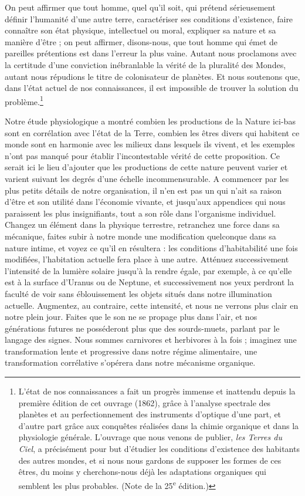 \documentclass[a4paper, 11pt, oneside, landscape]{article}
\begin{document}
On peut affirmer que tout homme, quel qu'il soit, qui prétend sérieusement définir l'humanité d'une autre terre, caractériser ses conditions d'existence, faire connaître son état physique, intellectuel ou moral, expliquer sa nature et sa manière d'être ; on peut affirmer, disons-nous, que tout homme qui émet de pareilles prétentions est dans l'erreur la plus vaine. Autant nous proclamons avec la certitude d'une conviction inébranlable la vérité de la pluralité des Mondes, autant nous répudions le titre de colonisateur de planètes. Et nous soutenons que, dans l'état actuel de nos connaissances, il est impossible de trouver la solution du problème.\footnote{L'état de nos connaissances a fait un progrès immense et inattendu depuis la première édition de cet ouvrage (1862), grâce à l'analyse spectrale des planètes et au perfectionnement des instruments d'optique d'une part, et d'autre part grâce aux conquêtes réalisées dans la chimie organique et dans la physiologie générale. L'ouvrage que nous venons de publier, \emph{les Terres du Ciel}, a précisément pour but d'étudier les conditions d'existence des habitants des autres mondes, et si nous nous gardons de supposer les formes de ces êtres, du moins y cherchons-nous déjà les adaptations organiques qui semblent les plus probables. (Note de la 25\textsuperscript{e} édition.)}

Notre étude physiologique a montré combien les productions de la Nature ici-bas sont en corrélation avec l'état de la Terre, combien les êtres divers qui habitent ce monde sont en harmonie avec les milieux dans lesquels ils vivent, et les exemples n'ont pas manqué pour établir l'incontestable vérité de cette proposition. Ce serait ici le lieu d'ajouter que les productions de cette nature peuvent varier et varient suivant les degrés d'une échelle incommensurable. A commencer par les plus petits détails de notre organisation, il n'en est pas un qui n'ait sa raison d'être et son utilité dans l'économie vivante, et jusqu'aux appendices qui nous paraissent les plus insignifiants, tout a son rôle dans l'organisme individuel. Changez un élément dans la physique terrestre, retranchez une force dans sa mécanique, faites subir à notre monde une modification quelconque dans sa nature intime, et voyez ce qu'il en résultera : les conditions d'habitabilité une fois modifiées, l'habitation actuelle fera place à une autre. Atténuez successivement l'intensité de la lumière solaire jusqu'à la rendre égale, par exemple, à ce qu'elle est à la surface d'Uranus ou de Neptune, et successivement nos yeux perdront la faculté de voir sans éblouissement les objets situés dans notre illumination actuelle. Augmentez, au contraire, cette intensité, et nous ne verrons plus clair en notre plein jour. Faites que le son ne se propage plus dans l'air, et nos générations futures ne posséderont plus que des sourds-muets, parlant par le langage des signes. Nous sommes carnivores et herbivores à la fois ; imaginez une transformation lente et progressive dans notre régime alimentaire, une transformation corrélative s'opérera dans notre mécanisme organique.
\end{document}
